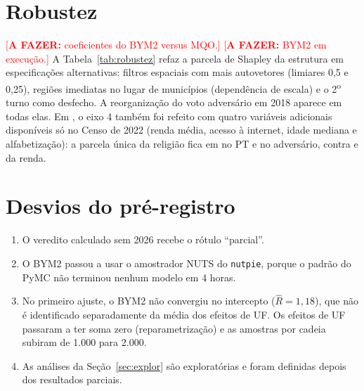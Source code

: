\documentclass[11pt,a4paper]{article}
\newcommand{\todo}[1]{\textcolor{red}{[\textbf{A FAZER:} #1]}}
\newcommand{\ordo}{\textsuperscript{o}}
\begin{document}
\section{Robustez}

\ifbymdois
\begin{table}[htbp]\centering\small
\caption{Diagnósticos de convergência do BYM2 \citep{riebler2016}.}\label{tab:bym2}

\end{table}
\todo{coeficientes do BYM2 versus MQO.}
\else
\todo{BYM2 \citep{riebler2016} em execução.}
\fi
A Tabela~\ref{tab:robustez} refaz a parcela de Shapley da estrutura em especificações alternativas:
filtros espaciais com mais autovetores (limiares 0,5 e 0,25), regiões imediatas no lugar de
municípios (dependência de escala) e o 2\ordo{} turno como desfecho. A reorganização do voto
adversário em 2018 aparece em todas elas. Em \anoFim{}, o eixo 4 também foi refeito com quatro
variáveis adicionais disponíveis só no Censo de 2022 (renda média, acesso à internet, idade mediana e
alfabetização): a parcela única da religião fica em  no PT e  no
adversário, contra  e  da renda.

\begin{table}[htbp]\centering\small
\caption{Parcela de Shapley da estrutura social por especificação, alinhada por campo (estimativas
pontuais). O 2\ordo{} turno está disponível para o bloco A de cada ano.}\label{tab:robustez}

\end{table}

\section{Desvios do pré-registro}

\begin{enumerate}
  \item O veredito calculado sem 2026 recebe o rótulo ``parcial''.
  \item O BYM2 passou a usar o amostrador NUTS do \texttt{nutpie}, porque o padrão do PyMC não
        terminou nenhum modelo em 4 horas.
  \item No primeiro ajuste, o BYM2 não convergiu no intercepto ($\hat R = 1{,}18$), que não é
        identificado separadamente da média dos efeitos de UF. Os efeitos de UF passaram a ter soma
        zero (reparametrização) e as amostras por cadeia subiram de 1.000 para 2.000.
  \item As análises da Seção~\ref{sec:explor} são exploratórias e foram definidas depois dos resultados
        parciais.
\end{enumerate}



\end{document}
